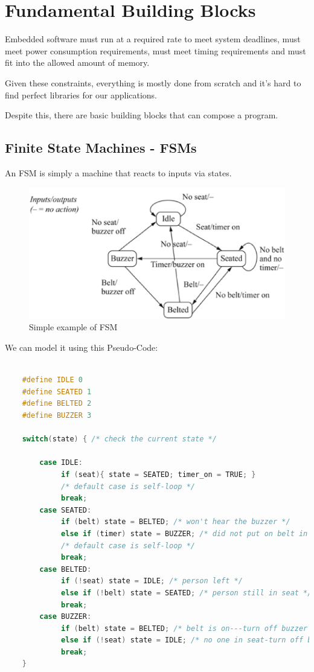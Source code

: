 \chapter{Fundamental Building Blocks}
Embedded software must run at a required rate to meet system deadlines, must meet power consumption
requirements, must meet timing requirements and must fit into the allowed amount of memory.


Given these constraints, everything is mostly done from scratch and it's hard to find perfect libraries for
our applications.


Despite this, there are basic building blocks that can compose a program.

\section{Finite State Machines - FSMs}

An FSM is simply a machine that reacts to inputs via states.

\begin{figure}[H]
    \centering
    \includegraphics[width=0.5\linewidth]{img/image_60.png}
    \caption{Simple example of FSM}
\end{figure}

We can model it using this Pseudo-Code:


\begin{lstlisting}[language=c++]

    #define IDLE 0
    #define SEATED 1
    #define BELTED 2
    #define BUZZER 3
    
    switch(state) { /* check the current state */
    
        case IDLE:
             if (seat){ state = SEATED; timer_on = TRUE; }
             /* default case is self-loop */
             break;
        case SEATED:
             if (belt) state = BELTED; /* won't hear the buzzer */
             else if (timer) state = BUZZER; /* did not put on belt in time */
             /* default case is self-loop */
             break;
        case BELTED:
             if (!seat) state = IDLE; /* person left */
             else if (!belt) state = SEATED; /* person still in seat */
             break;
        case BUZZER:
             if (belt) state = BELTED; /* belt is on---turn off buzzer */
             else if (!seat) state = IDLE; /* no one in seat-turn off buzzer */
             break;
    }
\end{lstlisting}


